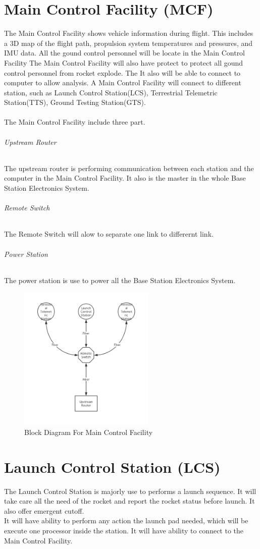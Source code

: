 \documentclass[12pt,article]{memoir}
\begin{document}
\chapter{Main Control Facility (MCF)}
The Main Control Facility shows vehicle information during flight. This includes a 3D map of the flight path, propulsion system temperatures and pressures, and IMU data. All the gound control personnel will be locate in the Main Control Facility The Main Control Facility will also have protect to protect all gound control personnel from rocket explode. The  It also will be able to connect to computer to allow analysis. A Main Control Facility will connect to different station, such as  Launch Control Station(LCS), Terrestrial Telemetric Station(TTS), Ground Testing Station(GTS).\\\\
The Main Control Facility include three part.
\subparagraph{Upstream Router}
The upstream router is performing communication between each station and the computer in the Main Control Facility. It also is the master in the whole Base Station Electronics System.
\subparagraph{Remote Switch}
The Remote Switch will alow to separate one link to differernt link.
\subparagraph{Power Station} The power station is use to power all the Base Station Electronics System.
\\
\begin{figure}[htp]
\begin{center}
\includegraphics[width=0.58\textwidth]{img/ES00004_MCF.png}
 \caption{Block Diagram For Main Control Facility}	
\end{center}
\end{figure}
\newpage
\chapter{Launch Control Station (LCS)}
The Launch Control Station is majorly use to performs a launch sequence. It will take care all the need of the rocket and report the rocket status before launch. It also offer emergent cutoff. \\
It will have ability to perform any action the launch pad needed, which will be execute one processor inside the station. It will have ability to connect to the Main Control Facility.
\newpage
\end{document}
